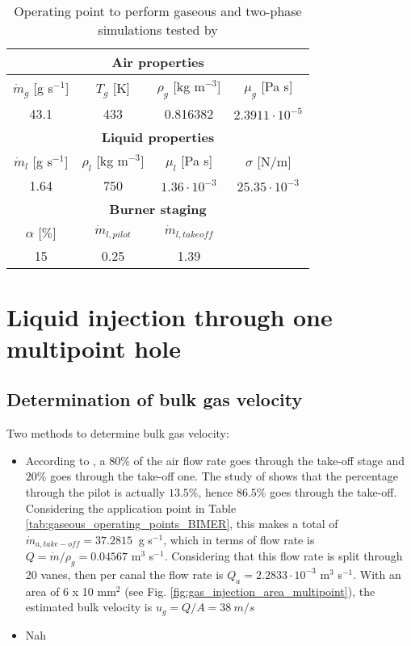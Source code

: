 \begin{table}[!h]
\centering
\caption{Operating point to perform gaseous and two-phase simulations tested by }
\begin{tabular}{|c|c|c|c|}
\hline
\multicolumn{4}{|c|}{\textbf{Air properties}} \\
\hline
$\dot{m}_g$ [g s$^{-1}$] & $T_g$ [K] & $\rho_g$ [kg m$^{-3}$]  & $\mu_g$ [Pa s]  \\
\hline
43.1 & 433 & 0.816382 & $2.3911 \cdot 10^{-5}$ \\
\hline
\hline
\multicolumn{4}{|c|}{\textbf{Liquid properties}} \\
\hline
$\dot{m}_l$ [g s$^{-1}$] & $\rho_l$ [kg m$^{-3}]$   & $\mu_l$ [Pa s]   & $\sigma$ [N/m]   \\
\hline
1.64 & 750 & $1.36 \cdot 10^{-3}$ & $25.35 \cdot 10^{-3}$ \\
\hline
\hline
\multicolumn{4}{|c|}{\textbf{Burner staging}} \\
\hline
$\alpha$ [$\%$] & $\dot{m}_{l,pilot}$ & $\dot{m}_{l,takeoff}$ & \\
\hline
15 & 0.25 & 1.39 & \\
\hline
\end{tabular}
\label{tab:liquid_operating_point_Renaud}
\end{table}


\section{Liquid injection through one multipoint hole}

\subsection{Determination of bulk gas velocity}

Two methods to determine bulk gas velocity:

\begin{itemize}

	\item According to , a $80 \%$ of the air flow rate goes through the take-off stage and $20 \%$ goes through the take-off one. The study of  shows that the percentage through the pilot is actually $13.5 \%$, hence $86.5 \%$ goes through the take-off. Considering the application point in Table \ref{tab:gaseous_operating_points_BIMER}, this makes a total of $\dot{m}_{a,take-off} = 37.2815 ~ $ g s$^{-1}$, which in terms of flow rate is $Q = \dot{m} / \rho_g = 0.04567 $ m$^{3}$ s$^{-1}$. Considering that this flow rate is split through 20 vanes, then per canal the flow rate is $Q_a = 2.2833 \cdot 10^{-3}$ m$^{3}$ s$^{-1}$. With an area of 6 x 10 mm$^2$ (see Fig. \ref{fig:gas_injection_area_multipoint}), the estimated bulk velocity is $u_g = Q / A = 38 ~ m/s$
	
	\item Nah

\end{itemize}

